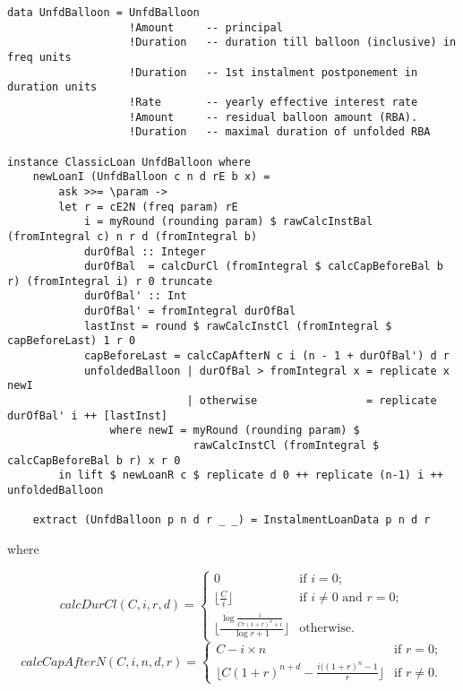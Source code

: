 \documentclass[letterpaper,11pt]{article}
\begin{document}
{\small
\begin{verbatim}
data UnfdBalloon = UnfdBalloon
                   !Amount     -- principal
                   !Duration   -- duration till balloon (inclusive) in freq units
                   !Duration   -- 1st instalment postponement in duration units
                   !Rate       -- yearly effective interest rate
                   !Amount     -- residual balloon amount (RBA).
                   !Duration   -- maximal duration of unfolded RBA

instance ClassicLoan UnfdBalloon where
    newLoanI (UnfdBalloon c n d rE b x) =
        ask >>= \param ->
        let r = cE2N (freq param) rE
            i = myRound (rounding param) $ rawCalcInstBal (fromIntegral c) n r d (fromIntegral b)
            durOfBal :: Integer
            durOfBal  = calcDurCl (fromIntegral $ calcCapBeforeBal b r) (fromIntegral i) r 0 truncate
            durOfBal' :: Int
            durOfBal' = fromIntegral durOfBal
            lastInst = round $ rawCalcInstCl (fromIntegral $ capBeforeLast) 1 r 0
            capBeforeLast = calcCapAfterN c i (n - 1 + durOfBal') d r
            unfoldedBalloon | durOfBal > fromIntegral x = replicate x newI
                            | otherwise                 = replicate durOfBal' i ++ [lastInst]
                where newI = myRound (rounding param) $
                             rawCalcInstCl (fromIntegral $ calcCapBeforeBal b r) x r 0
        in lift $ newLoanR c $ replicate d 0 ++ replicate (n-1) i ++ unfoldedBalloon

    extract (UnfdBalloon p n d r _ _) = InstalmentLoanData p n d r
\end{verbatim}
}

where

\begin{equation}
calcDurCl (C, i, r, d) = \left\{ \begin{array}{ll}
                                    0 & \mbox{if $i=0$};\\
                                    \lfloor \frac{C}{i} \rfloor& \mbox{if $i \neq 0$ and $r=0$};\\
                                    \lfloor \frac{\log \frac{i}{Cr(1+r)^d+i}}{\log r+1} \rfloor & \mbox{otherwise}.
                                    \end{array} \right.
\end{equation}
\begin{equation}
calcCapAfterN (C, i, n, d, r) = \left\{ \begin{array}{ll}
                                    C - i \times n & \mbox{if $r=0$};\\
                                    \lfloor C(1+r)^{n+d} - \frac{i((1+r)^n - 1}{r} \rfloor & \mbox{if $r \neq 0$}.
                                    \end{array} \right.
\end{equation}
\end{document}
